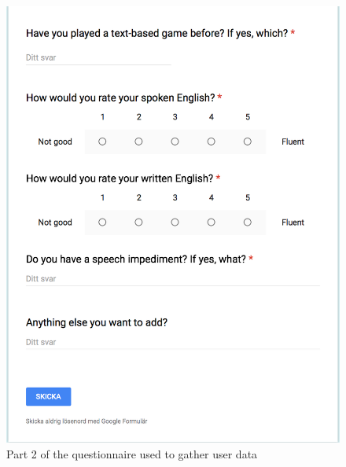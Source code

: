 \documentclass[a4paper,12pt]{kth-mag}
\begin{document}
\begin{figure}[ht]
	\centering
	\includegraphics[keepaspectratio, scale = 0.68]{images/user_data_2.png}
	\caption{\small{Part 2 of the questionnaire used to gather user data}}\label{fig:ud_2}
\end{figure}
\end{document}
